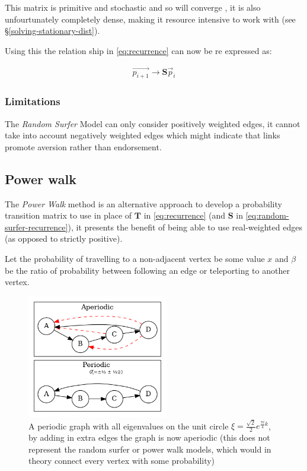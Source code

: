 \documentclass[11pt]{report}
\begin{document}
This matrix is primitive and stochastic and so will converge
\cite[]{langvilleGooglePageRankScience2012}, it is also
unfourtunately completely dense, making it resource intensive to work with (see
\S \ref{solving-stationary-dist}).

Using this the relation ship in \eqref{eq:recurrence} can now be re
expressed as:

\begin{align}
\vec{p_{i+1}} \rightarrow \mathbf{S} \vec{p}_{i} \label{eq:random-surfer-recurrence}
\end{align}






\subsubsection{Limitations}
\label{sec:org725b0b3}
The \emph{Random Surfer} Model can only consider positively weighted edges, it cannot
take into account negatively weighted edges which might indicate that
links promote aversion rather than endorsement.



\subsection{Power walk}
\label{pwalk}



The \emph{Power Walk} method is an alternative approach to develop a probability
transition matrix to use in place of \(\mathbf{T}\) in \eqref{eq:recurrence} (and \(\mathbf{S}\) in \eqref{eq:random-surfer-recurrence}), it presents the benefit of being able to use real-weighted edges (as opposed to strictly positive).

Let the probability of travelling to a non-adjacent vertex be some value \(x\)
and \(\beta\) be the ratio of probability between following an edge or
teleporting to another vertex.


 \begin{figure}
 \includegraphics[width=0.55\textwidth]{media/dot/aperiodic.dot.png}
 \caption{\label{fig:aperiodic}A periodic graph with all eigenvalues on the unit circle \(\xi = \frac{\sqrt{2}}{2} e^{\frac{\pi i}{4} k}\), by adding in extra edges the graph is now aperiodic (this does not represent the random surfer or power walk models, which would in theory connect every vertex with some probability)}
\end{figure}
\end{document}

